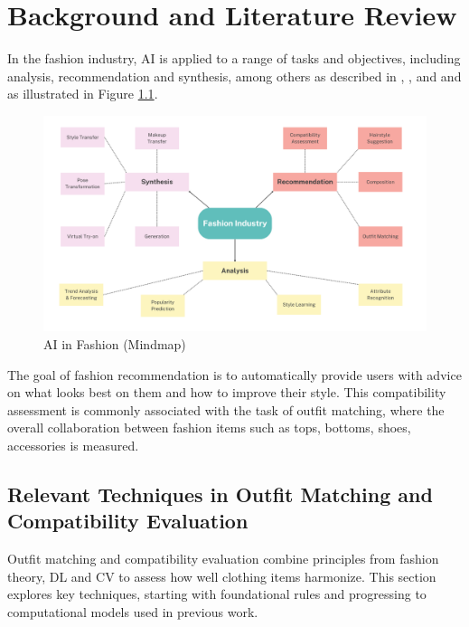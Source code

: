 \chapter{Background and Literature Review}

In the fashion industry, \acs{AI} is applied to a range of tasks and objectives, including analysis, recommendation and synthesis, among others as described in \cite[cf.]{chen_survey_2023}, \cite[cf.]{deldjoo_review_2022}, \cite[cf.]{kouslis_ai_2024} and \cite[cf.]{cheng_fashion_2020} and as illustrated in Figure \ref{fig:fashion-areas}.

\begin{figure}[h]
  \centering
  \includegraphics[width=\linewidth]{Abbildungen/fashion-areas.png}
  \caption{AI in Fashion (Mindmap)}
  \label{fig:fashion-areas}
\end{figure}

The goal of fashion recommendation is to automatically provide users with advice on what looks best on them and how to improve their style. This compatibility assessment is commonly associated with the task of outfit matching, where the overall collaboration between fashion items such as tops, bottoms, shoes, accessories is measured. \cite[cf.]{chen_survey_2023}

\section{Relevant Techniques in Outfit Matching and Compatibility Evaluation}

Outfit matching and compatibility evaluation combine principles from fashion theory, \acs{DL} and \acs{CV} to assess how well clothing items harmonize. This section explores key techniques, starting with foundational rules and progressing to computational models used in previous work.

